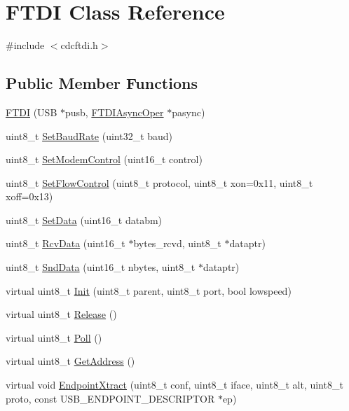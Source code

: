 \hypertarget{class_f_t_d_i}{\section{\-F\-T\-D\-I \-Class \-Reference}
\label{class_f_t_d_i}
}


{\ttfamily \#include $<$cdcftdi.\-h$>$}

\subsection*{\-Public \-Member \-Functions}
\begin{DoxyCompactItemize}
\item 
\hyperlink{class_f_t_d_i_ae517a5435ada4145998aa7b07e78adb3}{\-F\-T\-D\-I} (\-U\-S\-B $\ast$pusb, \hyperlink{class_f_t_d_i_async_oper}{\-F\-T\-D\-I\-Async\-Oper} $\ast$pasync)
\item 
uint8\-\_\-t \hyperlink{class_f_t_d_i_acb8efdc33bd503563018b7eee577aecf}{\-Set\-Baud\-Rate} (uint32\-\_\-t baud)
\item 
uint8\-\_\-t \hyperlink{class_f_t_d_i_a86130f30e67e934346c3c7faf5ee6c56}{\-Set\-Modem\-Control} (uint16\-\_\-t control)
\item 
uint8\-\_\-t \hyperlink{class_f_t_d_i_a7c107efeff2d46cb711cadd0a6c31636}{\-Set\-Flow\-Control} (uint8\-\_\-t protocol, uint8\-\_\-t xon=0x11, uint8\-\_\-t xoff=0x13)
\item 
uint8\-\_\-t \hyperlink{class_f_t_d_i_ab7d7c305729fe4bbc746fa0569261a71}{\-Set\-Data} (uint16\-\_\-t databm)
\item 
uint8\-\_\-t \hyperlink{class_f_t_d_i_aa367ae72fbfda931cae8ec751e9dc434}{\-Rcv\-Data} (uint16\-\_\-t $\ast$bytes\-\_\-rcvd, uint8\-\_\-t $\ast$dataptr)
\item 
uint8\-\_\-t \hyperlink{class_f_t_d_i_a90309b11a160bad9ceb0b77545b7a240}{\-Snd\-Data} (uint16\-\_\-t nbytes, uint8\-\_\-t $\ast$dataptr)
\item 
virtual uint8\-\_\-t \hyperlink{class_f_t_d_i_a2d40115414dadfee8c284e0f5d397621}{\-Init} (uint8\-\_\-t parent, uint8\-\_\-t port, bool lowspeed)
\item 
virtual uint8\-\_\-t \hyperlink{class_f_t_d_i_aadee262e2eda31deda790d5d10090b6f}{\-Release} ()
\item 
virtual uint8\-\_\-t \hyperlink{class_f_t_d_i_a5f383dd8eb114563194da011f1d613fd}{\-Poll} ()
\item 
virtual uint8\-\_\-t \hyperlink{class_f_t_d_i_ae224d7ea581e5df3b11416410a679086}{\-Get\-Address} ()
\item 
virtual void \hyperlink{class_f_t_d_i_a3e3f771b9f2a99fcedf7ed665b597109}{\-Endpoint\-Xtract} (uint8\-\_\-t conf, uint8\-\_\-t iface, uint8\-\_\-t alt, uint8\-\_\-t proto, const \-U\-S\-B\-\_\-\-E\-N\-D\-P\-O\-I\-N\-T\-\_\-\-D\-E\-S\-C\-R\-I\-P\-T\-O\-R $\ast$ep)
\end{DoxyCompactItemize}


